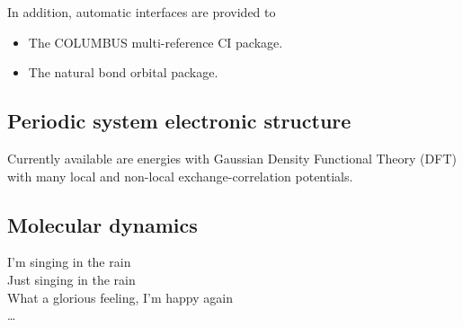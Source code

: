 In addition, automatic interfaces are provided to
\begin{itemize}
\item The COLUMBUS multi-reference CI package.
\item The natural bond orbital package.
\end{itemize}

\subsection{Periodic system electronic structure}

Currently available are energies with Gaussian Density Functional
Theory (DFT) with many local and non-local exchange-correlation
potentials.

\subsection{Molecular dynamics}

I'm singing in the rain\\
Just singing in the rain\\
What a glorious feeling, I'm happy again\\
\ldots

